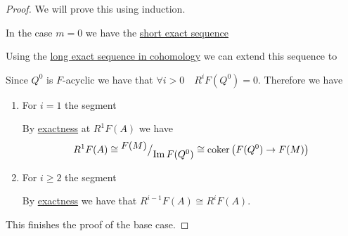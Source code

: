 \documentclass[../../../main]{subfiles}
\begin{document}
\begin{proof}
  We will prove this using induction.

  In the case \(m = 0\) we have the \hyperref[def:short-exact-sequence]{short exact sequence}
  \begin{center}
  \end{center}
  Using the \hyperref[thm:LES-in-cohomology]{long exact sequence in cohomology} we can extend this sequence to
  \begin{center}
  \end{center}
  Since \(Q^{0}\) is \(F\)-acyclic we have that \(\forall i > 0 \quad R^{i}F(Q^{0}) = 0\).
  Therefore we have
  \begin{enumerate}
    \item For \(i = 1\) the segment
          \begin{center}
          \end{center}
          By \hyperref[def:short-exact-sequence]{exactness} at \(R^{1}F(A)\) we have
          \begin{equation*}
            R^{1}F(A) \cong {^{\textstyle F(M)}\big/_{\textstyle \operatorname*{Im}F(Q^{0})}} \cong \operatorname*{coker} \left( F(Q^{0}) \to F(M) \right)
          \end{equation*}
    \item For \(i \geq 2\) the segment
          \begin{center}
          \end{center}
          By \hyperref[def:short-exact-sequence]{exactness} we have that \(R^{i-1}F(A) \cong R^{i}F(A)\).
  \end{enumerate}
  This finishes the proof of the base case.


\end{proof}
\end{document}

